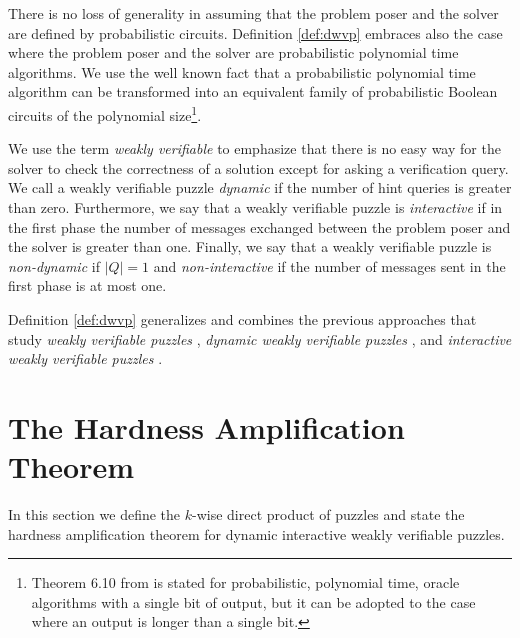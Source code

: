 There is no loss of generality in assuming that the problem poser and the solver are defined by probabilistic circuits.
Definition \ref{def:dwvp} embraces also the case where the problem poser and the solver are probabilistic polynomial time algorithms.
We use the well known fact \cite{LectureNotesCT} that a probabilistic polynomial time algorithm can be transformed into an equivalent
family of probabilistic Boolean circuits of the polynomial size\footnote{Theorem 6.10 from \cite{LectureNotesCT} is stated for probabilistic, polynomial time,
oracle algorithms with a single bit of output, but it can be adopted to the case where an output is longer than a single bit.}.

We use the term \textit{weakly verifiable} to emphasize that there is no easy way
for the solver to check the correctness of a solution except for asking a verification query.
We call a weakly verifiable puzzle \textit{dynamic} if the number of hint queries is greater than zero.
Furthermore, we say that a weakly verifiable puzzle is \textit{interactive} if in the first
phase the number of messages exchanged between the problem poser and the solver is greater than one.
Finally, we say that a weakly verifiable puzzle is \textit{non-dynamic} if $|Q| = 1$
and \textit{non-interactive} if the number of messages sent in the first phase is at most one.

Definition \ref{def:dwvp} generalizes and combines the previous approaches that study
\textit{weakly verifiable puzzles} \cite{canetti2005hardness},
\textit{dynamic weakly verifiable puzzles} \cite{dodis2009security}, and \textit{interactive weakly verifiable puzzles} \cite{holenstein2011general}.

%
\section{The Hardness Amplification Theorem}
\label{section:hardness_amplification_diwvp}
In this section we define the $k$-wise direct product of puzzles and state the hardness amplification theorem for dynamic interactive weakly verifiable puzzles.

